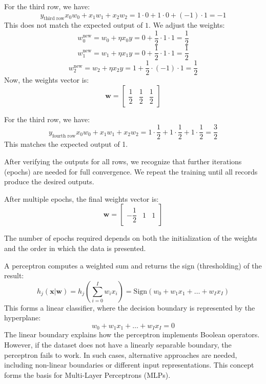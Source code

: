 \begin{example}
    For the third row, we have: 
    \[y_{\text{third row}}x_0w_0+x_1w_1+x_2w_2=1\cdot 0+1\cdot 0 + (-1)\cdot 1=-1\]
    This does not match the expected output of $1$.
    We adjust the weights:
    \[w_0^{\text{new}}=w_0+\eta x_0y=0+\dfrac{1}{2}\cdot 1 \cdot 1=\dfrac{1}{2}\]
    \[w_1^{\text{new}}=w_1+\eta x_1y=0+\dfrac{1}{2}\cdot 1 \cdot 1=\dfrac{1}{2}\]
    \[w_2^{\text{new}}=w_2+\eta x_2y=1+\dfrac{1}{2}\cdot (-1) \cdot 1=\dfrac{1}{2}\]
    Now, the weights vector is:
    \[\mathbf{w}=\begin{bmatrix} \dfrac{1}{2} & \dfrac{1}{2} & \dfrac{1}{2} \end{bmatrix}\]

    For the third row, we have: 
    \[y_{\text{fourth row}}x_0w_0+x_1w_1+x_2w_2=1\cdot \dfrac{1}{2}+1\cdot \dfrac{1}{2} + 1\cdot \dfrac{1}{2}=\dfrac{3}{2}\]
    This matches the expected output of 1.

    After verifying the outputs for all rows, we recognize that further iterations (epochs) are needed for full convergence.
    We repeat the training until all records produce the desired outputs.

    After multiple epochs, the final weights vector is:
    \[\mathbf{w}=\begin{bmatrix} -\dfrac{1}{2} & 1 & 1 \end{bmatrix}\]

    The number of epochs required depends on both the initialization of the weights and the order in which the data is presented.
\end{example}
A perceptron computes a weighted sum and returns the sign (thresholding) of the result:
\[h_j(\mathbf{x}|\mathbf{w})=h_j\left(\sum_{i=0}^Iw_ix_i\right)=\text{Sign}(w_0+w_1x_1+\dots+w_Ix_I)\]
This forms a linear classifier, where the decision boundary is represented by the hyperplane:
\[w_0+w_1x_1+\dots+w_Ix_I=0\]
The linear boundary explains how the perceptron implements Boolean operators. 
However, if the dataset does not have a linearly separable boundary, the perceptron fails to work. 
In such cases, alternative approaches are needed, including non-linear boundaries or different input representations. 
This concept forms the basis for Multi-Layer Perceptrons (MLPs).